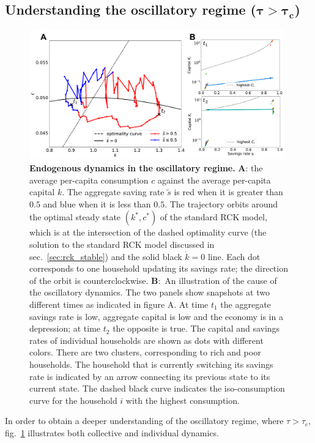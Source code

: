 \subsection{Understanding the oscillatory regime ($\mathbf{\tau \!>\! \tau_{c} }$)}
\label{sec:savings_oscillations}
\begin{figure}[t]
     \centering
       \includegraphics[width=0.98\textwidth]
       {figures/fig3.pdf}
       \caption[Endogenous dynamics in the oscillatory regime]{\textbf{ Endogenous dynamics in the oscillatory regime. } \textbf{A}: the average per-capita consumption $c$ against the average per-capita capital $k$. The aggregate saving rate $\tilde{s}$ is red when it is greater than $0.5$ and blue when it is less than $0.5$. The trajectory orbits around the optimal steady state $(k^\ast,c^\ast)$  of the standard RCK model, which is at the intersection of the dashed optimality curve (the solution to the standard RCK model discussed in sec.~\ref{sec:rck_stable}) and the solid black $\dot{k}=0$ line. Each dot corresponds to one household updating its savings rate; the direction of the orbit is counterclockwise.
\textbf{B}:~An illustration of the cause of the oscillatory dynamics.  The two panels show snapshots at two different times as indicated in figure A.  At time $t_1$ the aggregate savings rate is low, aggregate capital is low and the economy is in a depression; at time $t_2$ the opposite is true.  The capital and savings rates of individual households are shown as dots with different colors.  There are two clusters, corresponding to rich and poor households.  The household that is currently switching its savings rate is indicated by an arrow connecting its previous state to its current state.  The dashed black curve indicates the iso-consumption curve for the household $i$ with the highest consumption. }
\label{fig:dynamics}
\end{figure} 
In order to obtain a deeper understanding of the oscillatory regime, where $\tau > \tau_{c}$, fig.~\ref{fig:dynamics} illustrates both collective and individual dynamics.

